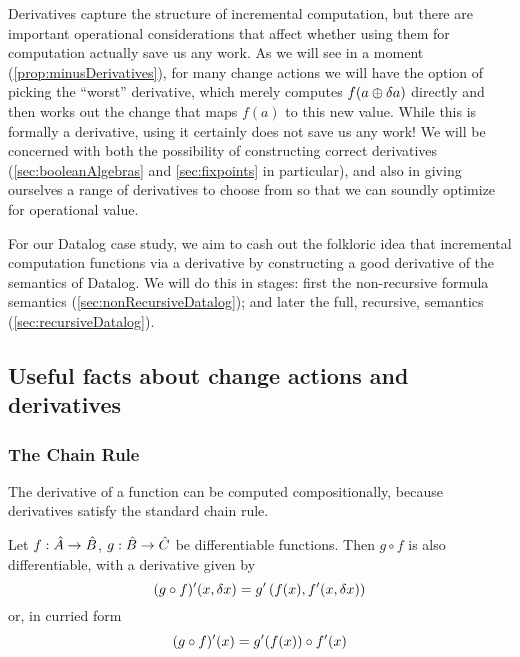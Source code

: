 Derivatives capture the structure of incremental computation, but there are
important operational considerations that affect whether using them for
computation actually save us
any work. As we will see in a moment (\cref{prop:minusDerivatives}), for many 
change actions we will have the option
of picking the ``worst'' derivative, which merely computes $f(a \oplus \delta a)$
directly and then works out the change that maps $f(a)$ to this new value. 
While this is formally a derivative, using it certainly does not save us any work! We will be concerned 
with both the possibility of constructing correct derivatives
(\cref{sec:booleanAlgebras} and \cref{sec:fixpoints} in particular), and also in
giving ourselves a range of derivatives to choose from so that we can soundly
optimize for operational value.

For our Datalog case study, we aim to cash out the folkloric idea that
incremental computation functions via a derivative by constructing a good derivative of
the semantics of Datalog. We will do this in stages: first the non-recursive
formula semantics (\cref{sec:nonRecursiveDatalog}); and later the full, recursive, semantics 
(\cref{sec:recursiveDatalog}).

\subsection{Useful facts about change actions and derivatives}

\subsubsection{The Chain Rule}

The derivative of a function can be computed compositionally, because derivatives satisfy the standard chain rule.

\begin{thm}
  Let $f: \hat{A} \rightarrow \hat{B}$, $g: \hat{B} \rightarrow \hat{C}$ be differentiable functions. Then $g \circ f$ is also
  differentiable, with a derivative given by
  \begin{displaymath}
    (g \circ f)'(x, \delta x) = g'\left(f(x), f'(x, \delta x)\right)
  \end{displaymath}
  or, in curried form
  \begin{displaymath}
    (g \circ f)'(x) = g'(f(x)) \circ f'(x)
  \end{displaymath}
\end{thm}

